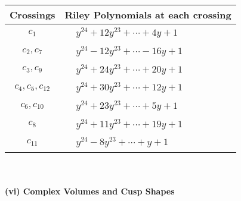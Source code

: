 \documentclass[1p]{elsarticle_modified}
\theoremstyle{definition}
\begin{document}
\begin{tabular}{m{50pt}|m{274pt}}
Crossings & \hspace{64pt}Riley Polynomials at each crossing \\
\hline $$\begin{aligned}c_{1}\end{aligned}$$&$\begin{aligned}
&y^{24}+12 y^{23}+\cdots+4 y+1
\end{aligned}$\\
\hline $$\begin{aligned}c_{2},c_{7}\end{aligned}$$&$\begin{aligned}
&y^{24}-12 y^{23}+\cdots-16 y+1
\end{aligned}$\\
\hline $$\begin{aligned}c_{3},c_{9}\end{aligned}$$&$\begin{aligned}
&y^{24}+24 y^{23}+\cdots+20 y+1
\end{aligned}$\\
\hline $$\begin{aligned}c_{4},c_{5},c_{12}\end{aligned}$$&$\begin{aligned}
&y^{24}+30 y^{23}+\cdots+12 y+1
\end{aligned}$\\
\hline $$\begin{aligned}c_{6},c_{10}\end{aligned}$$&$\begin{aligned}
&y^{24}+23 y^{23}+\cdots+5 y+1
\end{aligned}$\\
\hline $$\begin{aligned}c_{8}\end{aligned}$$&$\begin{aligned}
&y^{24}+11 y^{23}+\cdots+19 y+1
\end{aligned}$\\
\hline $$\begin{aligned}c_{11}\end{aligned}$$&$\begin{aligned}
&y^{24}-8 y^{23}+\cdots+y+1
\end{aligned}$\\
\hline
\end{tabular}\\~\\
\newpage\flushleft \textbf{(vi) Complex Volumes and Cusp Shapes}
\end{document}

